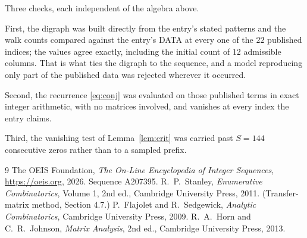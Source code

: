 \documentclass[11pt,a4paper]{article}
\theoremstyle{plain}
\theoremstyle{definition}
\begin{document}
Three checks, each independent of the algebra above.

First, the digraph was built directly from the entry's stated patterns and the walk counts
compared against the entry's DATA at every one of the $22$ published indices; the
values agree exactly, including the initial count of $12$ admissible columns. That is
what ties the digraph to the sequence, and a model reproducing only part of the published
data was rejected wherever it occurred.

Second, the recurrence \eqref{eq:conj} was evaluated on those published terms in exact
integer arithmetic, with no matrices involved, and vanishes at every index the entry claims.

Third, the vanishing test of Lemma~\ref{lem:crit} was carried past $S=144$ consecutive
zeros rather than to a sampled prefix.

\begin{thebibliography}{9}
 The OEIS Foundation, \emph{The On-Line Encyclopedia of Integer
Sequences}, \url{https://oeis.org}, 2026. Sequence A207395.
 R.~P.~Stanley, \emph{Enumerative Combinatorics}, Volume 1, 2nd ed.,
Cambridge University Press, 2011. (Transfer-matrix method, Section 4.7.)
 P.~Flajolet and R.~Sedgewick, \emph{Analytic Combinatorics}, Cambridge
University Press, 2009.
 R.~A.~Horn and C.~R.~Johnson, \emph{Matrix Analysis}, 2nd ed., Cambridge
University Press, 2013.
\end{thebibliography}
\end{document}
